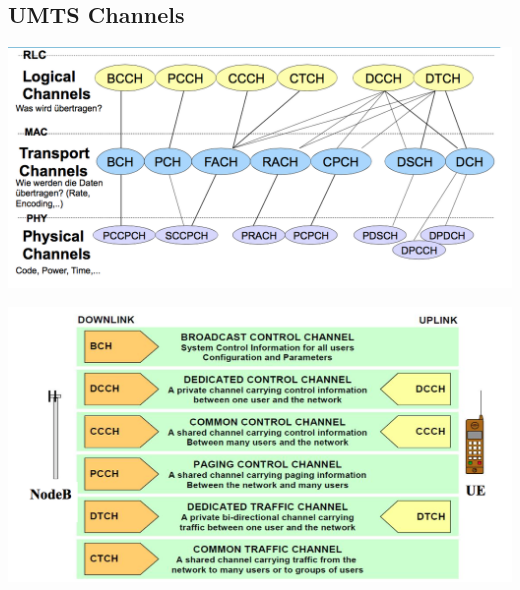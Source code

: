 \subsection{UMTS Channels}
\begin{minipage}{0.5\linewidth}
\includegraphics[width = \linewidth]{./Pics/UMTSCH}
\end{minipage}
\begin{minipage}{0.5\linewidth}
\includegraphics[width = \linewidth]{./Pics/UMTSCH2}
\end{minipage}

